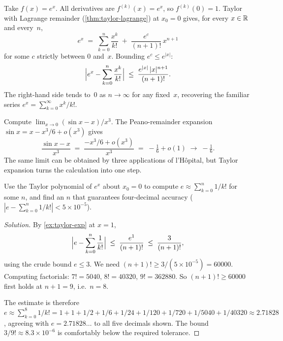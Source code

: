 \begin{example}
\label{ex:taylor-exp}
Take $f(x) = e^x$. All derivatives are $f^{(k)}(x) = e^x$, so
$f^{(k)}(0) = 1$. Taylor with Lagrange remainder
(\cref{thm:taylor-lagrange}) at $x_0 = 0$ gives, for every
$x \in \mathbb{R}$ and every~$n$,
\[
  e^x \;=\; \sum_{k=0}^{n} \frac{x^k}{k!} \;+\; \frac{e^c}{(n+1)!}\,x^{n+1}
\]
for some $c$ strictly between $0$ and~$x$. Bounding $e^c \le e^{|x|}$:
\[
  \Bigl| e^x - \sum_{k=0}^{n} \frac{x^k}{k!} \Bigr|
  \;\le\; \frac{e^{|x|} \,|x|^{n+1}}{(n+1)!}.
\]
The right-hand side tends to~$0$ as $n \to \infty$ for any
fixed~$x$, recovering the familiar series
$e^x = \sum_{k=0}^{\infty} x^k / k!$.
\end{example}

\begin{example}
\label{ex:taylor-limit}
Compute $\lim_{x \to 0} (\sin x - x) / x^3$. The Peano-remainder
expansion $\sin x = x - x^3/6 + o(x^3)$ gives
\[
  \frac{\sin x - x}{x^3} \;=\; \frac{-x^3/6 + o(x^3)}{x^3}
  \;=\; -\tfrac{1}{6} + o(1) \;\to\; -\tfrac{1}{6}.
\]
The same limit can be obtained by three applications of l'Hôpital,
but Taylor expansion turns the calculation into one step.
\end{example}

\begin{problem}
\label{prob:taylor-estimate-e}
Use the Taylor polynomial of $e^x$ about $x_0 = 0$ to compute
$e \approx \sum_{k=0}^{n} 1/k!$ for some $n$, and find an $n$ that
guarantees four-decimal accuracy
($|e - \sum_{k=0}^{n} 1/k!| < 5 \times 10^{-5}$).
\end{problem}

\begin{proof}[Solution]
By \cref{ex:taylor-exp} at $x = 1$,
\[
  \Bigl| e - \sum_{k=0}^{n} \frac{1}{k!} \Bigr| \;\le\; \frac{e^1}{(n+1)!}
  \;\le\; \frac{3}{(n+1)!},
\]
using the crude bound $e \le 3$. We need $(n+1)! \ge 3 / (5 \times 10^{-5}) = 60000$.
Computing factorials: $7! = 5040$, $8! = 40320$, $9! = 362880$. So
$(n+1)! \ge 60000$ first holds at $n + 1 = 9$, i.e.\ $n = 8$.

The estimate is therefore
$e \approx \sum_{k=0}^{8} 1/k! = 1 + 1 + 1/2 + 1/6 + 1/24 + 1/120 + 1/720 + 1/5040 + 1/40320 \approx 2.71828$,
agreeing with $e = 2.71828\ldots$ to all five decimals shown. The
bound $3/9! \approx 8.3 \times 10^{-6}$ is comfortably below the
required tolerance.
\end{proof}
